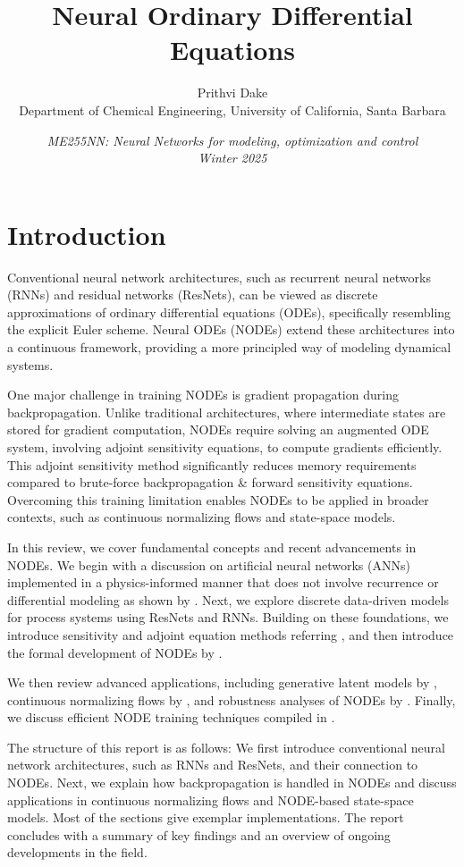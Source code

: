 \documentclass[fontsize=11pt]{article}
\title{\bf{Neural Ordinary Differential Equations}}
\author{Prithvi Dake\\
Department of Chemical Engineering, University of California, Santa Barbara}
\date{\textit{ME255NN: Neural Networks for modeling, optimization and control} \\
\textit{Winter 2025}}
\theoremstyle{definition}
\begin{document}
\maketitle
\section{Introduction}

Conventional neural network architectures, such as recurrent neural networks 
(RNNs) and residual networks (ResNets), can be viewed as discrete approximations
of ordinary differential equations (ODEs), specifically resembling the explicit
Euler scheme. Neural ODEs (NODEs) extend these architectures into a continuous 
framework, providing a more principled way of modeling dynamical systems.

One major challenge in training NODEs is gradient propagation during backpropagation.
Unlike traditional architectures, where intermediate states are stored for
gradient computation, NODEs require solving an augmented ODE system, involving
adjoint sensitivity equations, to compute gradients efficiently. This adjoint sensitivity 
method significantly reduces memory requirements compared to brute-force 
backpropagation \& forward sensitivity equations. Overcoming this training limitation enables NODEs to be 
applied in broader contexts, such as continuous normalizing flows and state-space 
models.

In this review, we cover fundamental concepts and recent advancements in NODEs. 
We begin with a discussion on artificial neural networks (ANNs) implemented in 
a physics-informed manner that does not involve recurrence or differential 
modeling as shown by \cite{raissi:perdikaris:karniadakis:2019}. Next, we explore
discrete data-driven models for process systems using ResNets and RNNs. 
Building on these foundations, we introduce sensitivity and adjoint equation 
methods referring \cite{stapor:froehlich:hasenauer:2018}, and then introduce the 
formal development of NODEs by \cite{chen:rubanova:bettencourt:duvenaud:2018}. 

We then review advanced applications, including generative latent models by
\cite{rubanova:chen:duvenaud:2019}, continuous normalizing flows by
\cite{grathwohl:chen:bettencourt:sutskever:duvenaud:2018}, and robustness 
analyses of NODEs by \cite{yan:du:tan:feng:2019}. Finally, we discuss efficient 
NODE training techniques compiled in \cite{finlay:jacobsen:nurbekyan:oberman:2020}.

The structure of this report is as follows: We first introduce conventional 
neural network architectures, such as RNNs and ResNets, and their connection 
to NODEs. Next, we explain how backpropagation is handled in NODEs and discuss 
applications in continuous normalizing flows and NODE-based state-space models. 
Most of the sections give exemplar implementations. 
The report concludes with a summary of key findings and an overview of ongoing 
developments in the field.
\end{document}
